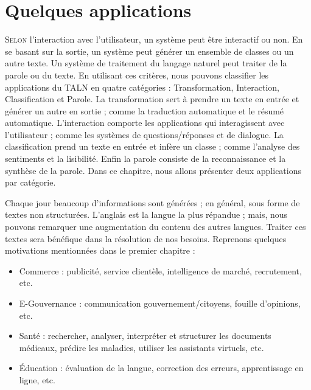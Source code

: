 \documentclass{KodeBook}
\begin{document}
		\mainmatter
	
\fi
\chapter{Quelques applications}

\begin{introduction}
	\lettrine{S}{elon} l'interaction avec l'utilisateur, un système peut être interactif ou non.
	En se basant sur la sortie, un système peut générer un ensemble de classes ou un autre texte. 
	Un système de traitement du langage naturel peut traiter de la parole ou du texte. 
	En utilisant ces critères, nous pouvons classifier les applications du TALN en quatre catégories : Transformation, Interaction, Classification et Parole. 
	La transformation sert à prendre un texte en entrée et générer un autre en sortie ; comme la traduction automatique et le résumé automatique. 
	L'interaction comporte les applications qui interagissent avec l'utilisateur ; comme les systèmes de questions/réponses et de dialogue.
	La classification prend un texte en entrée et infère un classe ; comme l'analyse des sentiments et la lisibilité.
	Enfin la parole consiste de la reconnaissance et la synthèse de la parole.
	Dans ce chapitre, nous allons présenter deux applications par catégorie.
\end{introduction} 

Chaque jour beaucoup d'informations sont générées ; en général, sous forme de textes non structurées. 
L'anglais est la langue la plus répandue ; mais, nous pouvons remarquer une augmentation du contenu des autres langues.
Traiter ces textes sera bénéfique dans la résolution de nos besoins.
Reprenons quelques motivations mentionnées dans le premier chapitre :
\begin{itemize}
	\item Commerce : publicité, service clientèle, intelligence de marché, recrutement, etc.
	\item E-Gouvernance : communication gouvernement/citoyens, fouille d'opinions, etc.
	\item Santé : rechercher, analyser, interpréter et structurer les documents médicaux, prédire les maladies, utiliser les assistants virtuels, etc.
	\item Éducation :  évaluation de la langue, correction des erreurs, apprentissage en ligne, etc.
\end{itemize}
\end{document}
